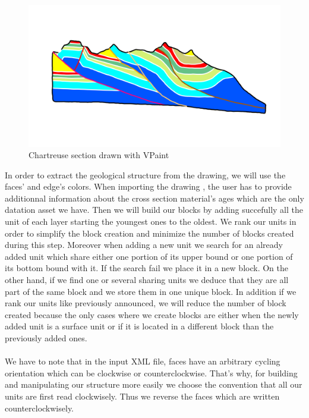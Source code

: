 \documentclass[12pt, a4paper]{report} %
\begin{document}

 \begin{figure}[H]
	\centering
	\includegraphics[scale=0.5]{chartreusevpaint.png}
	\caption{Chartreuse section drawn with VPaint}
	\label{chartreusevpaint}
\end{figure}

In order to extract the geological structure from the drawing, we will use the faces' and edge's colors. When importing the drawing , the user has to provide additionnal information about the cross section material's ages which are the only datation asset we have. Then we will build our blocks by adding succefully all the unit of each layer starting the youngest ones to the oldest. We rank our units in order to simplify the block creation and minimize the number of blocks created during this step. Moreover when adding a new unit we search for an already added unit which share either one portion of its upper bound  or one portion of its bottom bound with it. If the search fail we place it in a new block. On the other hand, if we find one or several sharing units we deduce that they are all part of the same block and we store them in one unique block. In addition if we rank our units like previously announced, we will reduce the number of block created because the only cases where we create blocks are either when the newly added unit is a surface unit or if it is located in a different block than the previously added ones.\\\\

We have to note that in the input XML file, faces have an arbitrary cycling orientation which can be clockwise or counterclockwise. 
That's why, for building and manipulating our structure more easily we choose the convention that all our units are first read clockwisely. Thus we reverse the faces which are written counterclockwisely.\\\\ 
 
\end{document}
